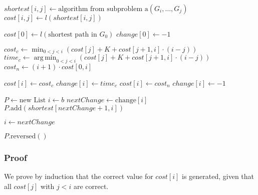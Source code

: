 \documentclass[12pt]{article}
\DeclareMathOperator*{\argmin}{arg\,min}
\begin{document}
\begin{algorithmic}
			\State $\mathit{shortest}[i, j] \gets \mbox{algorithm from subproblem a}(G_i, \ldots, G_j)$
			\State $\mathit{cost}[i, j] \gets l(\mathit{shortest}[i, j])$
		\EndFor
	\EndFor

	\State $\mathit{cost}[0] \gets l(\mbox{shortest path in $G_0$})$
	\State $\mathit{change}[0] \gets -1$

		\State $\mathit{cost}_c \gets \min_{0 < j < i} (\mathit{cost}[j] + K + \mathit{cost}[j+1, i] \cdot (i-j))$
		\State $\mathit{time}_c \gets \argmin_{0 < j < i} (\mathit{cost}[j] + K + \mathit{cost}[j+1, i] \cdot (i-j))$
		\State $\mathit{cost}_n \gets (i+1) \cdot \mathit{cost}[0, i]$

			\State $\mathit{cost}[i] \gets \mathit{cost}_c$
			\State $\mathit{change}[i] \gets \mathit{time}_c$
		\Else
			\State $\mathit{cost}[i] \gets \mathit{cost}_n$
			\State $\mathit{change}[i] \gets -1$
		\EndIf
	\EndFor

	\State $P \gets \mbox{new List}$
	\State $i \gets b$
		\State $\mathit{nextChange} \gets \mbox{change}[i]$
			\State $P.\mbox{add}(\mathit{shortest}[\mathit{nextChange} + 1, i])$
		\EndFor

		\State $i \gets \mathit{nextChange}$
	\EndWhile

	\Return $P.\mbox{reversed}()$
\end{algorithmic}

\subsubsection*{Proof}
We prove by induction that the correct value for $\mathit{cost}[i]$ is generated, given that all $\mathit{cost}[j]$ with $j < i$ are correct.
\end{document}
